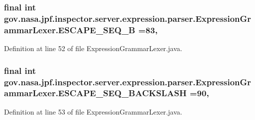 \subsubsection[{\texorpdfstring{E\+S\+C\+A\+P\+E\+\_\+\+S\+E\+Q\+\_\+B}{ESCAPE_SEQ_B}}]{\setlength{\rightskip}{0pt plus 5cm}final int gov.\+nasa.\+jpf.\+inspector.\+server.\+expression.\+parser.\+Expression\+Grammar\+Lexer.\+E\+S\+C\+A\+P\+E\+\_\+\+S\+E\+Q\+\_\+B =83\hspace{0.3cm}{\ttfamily [static]}, {\ttfamily [package]}}\hypertarget{classgov_1_1nasa_1_1jpf_1_1inspector_1_1server_1_1expression_1_1parser_1_1_expression_grammar_lexer_a0e6242c6f084262a38b761d799e7fbb4}{}\label{classgov_1_1nasa_1_1jpf_1_1inspector_1_1server_1_1expression_1_1parser_1_1_expression_grammar_lexer_a0e6242c6f084262a38b761d799e7fbb4}


Definition at line 52 of file Expression\+Grammar\+Lexer.\+java.

\subsubsection[{\texorpdfstring{E\+S\+C\+A\+P\+E\+\_\+\+S\+E\+Q\+\_\+\+B\+A\+C\+K\+S\+L\+A\+SH}{ESCAPE_SEQ_BACKSLASH}}]{\setlength{\rightskip}{0pt plus 5cm}final int gov.\+nasa.\+jpf.\+inspector.\+server.\+expression.\+parser.\+Expression\+Grammar\+Lexer.\+E\+S\+C\+A\+P\+E\+\_\+\+S\+E\+Q\+\_\+\+B\+A\+C\+K\+S\+L\+A\+SH =90\hspace{0.3cm}{\ttfamily [static]}, {\ttfamily [package]}}\hypertarget{classgov_1_1nasa_1_1jpf_1_1inspector_1_1server_1_1expression_1_1parser_1_1_expression_grammar_lexer_a5e96f4a08506b56532a0e397a0f682a5}{}\label{classgov_1_1nasa_1_1jpf_1_1inspector_1_1server_1_1expression_1_1parser_1_1_expression_grammar_lexer_a5e96f4a08506b56532a0e397a0f682a5}


Definition at line 53 of file Expression\+Grammar\+Lexer.\+java.

